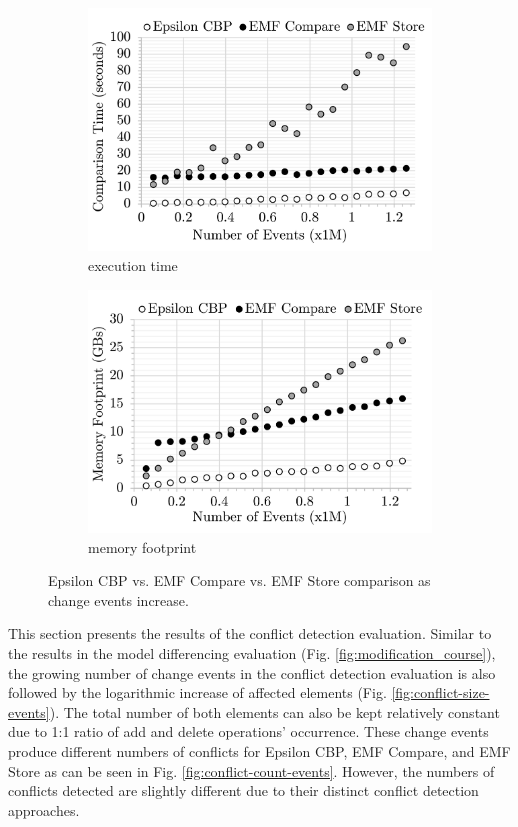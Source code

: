 \begin{figure}[ht]
\begin{subfigure}[t]{0.245\linewidth}
        \includegraphics[width=\linewidth]{conflict-time-events}
        \caption{execution time}
        \label{fig:conflict-time-events}
    \end{subfigure}
    \hfill
    \begin{subfigure}[t]{0.245\linewidth}
        \includegraphics[width=\linewidth]{conflict-memory-events}
        \caption{memory footprint}
        \label{fig:conflict-memory-events}
    \end{subfigure}
    \caption{Epsilon CBP vs. EMF Compare vs. EMF Store comparison as change events increase.}
    \label{fig:conflict_events}
\end{figure}

This section presents the results of the conflict detection evaluation. Similar to the results in the model differencing evaluation (Fig. \ref{fig:modification_course}), the growing number of change events in the conflict detection evaluation is also followed by the logarithmic increase of affected elements (Fig. \ref{fig:conflict-size-events}). The total number of both elements can also be kept relatively constant due to 1:1 ratio of \textsf{add} and \textsf{delete} operations' occurrence. These change events produce different numbers of conflicts for Epsilon CBP, EMF Compare, and EMF Store as can be seen in Fig. \ref{fig:conflict-count-events}. However, the numbers of conflicts detected are slightly different due to their distinct conflict detection approaches. 

